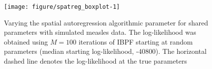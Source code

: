 \documentclass[12pt]{article}\usepackage[]{graphicx}\usepackage[]{xcolor}
\newenvironment{knitrout}{}{} %
\begin{document}


\newpage


\vspace{3mm}


\vspace{-5mm}

\begin{knitrout}
\color{fgcolor}\begin{figure}[h]

\texttt{[image: figure/spatreg\_boxplot-1]} \hfill{}

\caption[Varying the spatial autoregression algorithmic parameter for shared parameters with simulated measles data]{Varying the spatial autoregression algorithmic parameter for shared parameters with simulated measles data. The log-likelihood was obtained using $M=100$ iterations of IBPF starting at random parameters (median starting log-likelihood, -40800). The horizontal dashed line denotes the log-likelihood at the true parameters}\label{fig:spatreg_boxplot}
\end{figure}

\end{knitrout}
\end{document}

